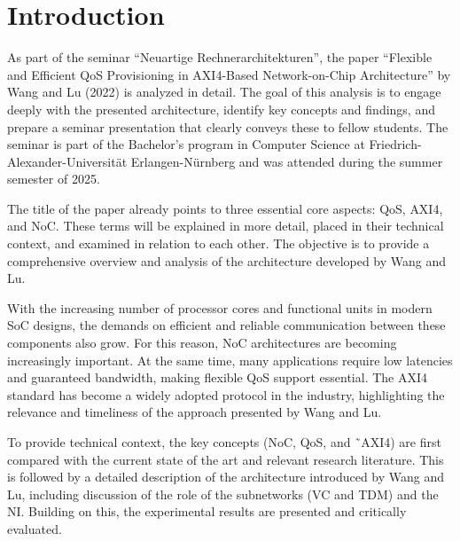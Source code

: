 \chapter{Introduction}

As part of the seminar “Neuartige Rechnerarchitekturen”, the paper “Flexible and Efficient QoS Provisioning in AXI4-Based Network-on-Chip Architecture” by Wang and Lu (2022) is analyzed in detail.\cite{wang_flexible_2022} The goal of this analysis is to engage deeply with the presented architecture, identify key concepts and findings, and prepare a seminar presentation that clearly conveys these to fellow students.
The seminar is part of the Bachelor's program in Computer Science at Friedrich-Alexander-Universität Erlangen-Nürnberg and was attended during the summer semester of 2025.

The title of the paper already points to three essential core aspects: \ac{QoS}, \ac{AXI4}, and \ac{NoC}. These terms will be explained in more detail, placed in their technical context, and examined in relation to each other. The objective is to provide a comprehensive overview and analysis of the architecture developed by Wang and Lu.

With the increasing number of processor cores and functional units in modern \ac{SoC} designs, the demands on efficient and reliable communication between these components also grow. For this reason, NoC architectures are becoming increasingly important. At the same time, many applications require low latencies and guaranteed bandwidth, making flexible QoS support essential. The AXI4 standard has become a widely adopted protocol in the industry, highlighting the relevance and timeliness of the approach presented by Wang and Lu.\cite{jake_ke_demystifying_2025}\cite{gomez-rodriguez_survey_2021}\cite{talwar_traffic_2013}

To provide technical context, the key concepts (\acs{NoC}, \acs{QoS}, and ˜\acs{AXI4}) are first compared with the current state of the art and relevant research literature. This is followed by a detailed description of the architecture introduced by Wang and Lu, including discussion of the role of the subnetworks (\ac{VC} and \ac{TDM}) and the \ac{NI}. Building on this, the experimental results are presented and critically evaluated.
